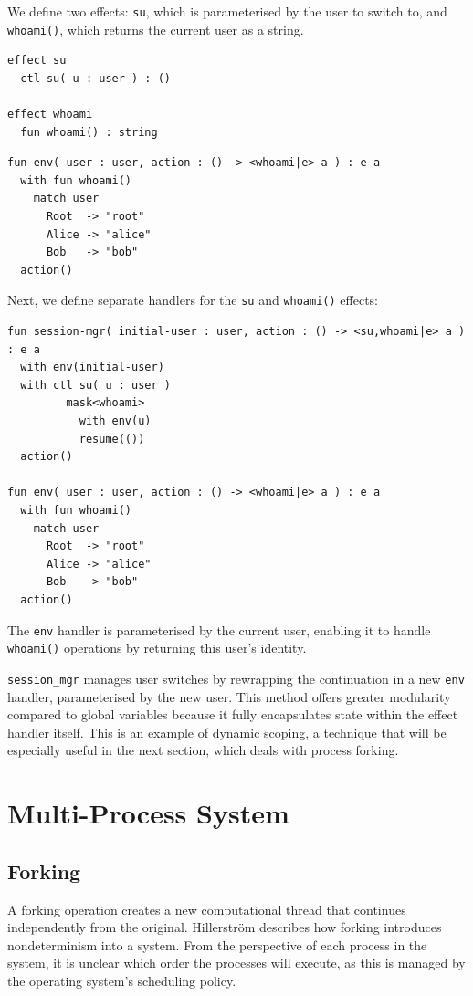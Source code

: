\documentclass[logo,bsc,singlespacing,parskip]{infthesis}
\begin{document}
We define two effects: \lstinline{su}, which is parameterised by the user to switch to, and \lstinline{whoami()}, which returns the current user as a string.

\begin{lstlisting}
effect su
  ctl su( u : user ) : ()

effect whoami
  fun whoami() : string
\end{lstlisting}


\begin{lstlisting}
fun env( user : user, action : () -> <whoami|e> a ) : e a
  with fun whoami() 
    match user
      Root  -> "root"
      Alice -> "alice"
      Bob   -> "bob"
  action()
\end{lstlisting}

Next, we define separate handlers for the \lstinline{su} and \lstinline{whoami()} effects:
\begin{lstlisting}
fun session-mgr( initial-user : user, action : () -> <su,whoami|e> a ) : e a
  with env(initial-user)
  with ctl su( u : user )
         mask<whoami>
           with env(u)
           resume(())
  action()

fun env( user : user, action : () -> <whoami|e> a ) : e a
  with fun whoami() 
    match user
      Root  -> "root"
      Alice -> "alice"
      Bob   -> "bob"
  action()
\end{lstlisting}

The \lstinline{env} handler is parameterised by the current user, enabling it to handle \lstinline{whoami()} operations by returning this user's identity.

\lstinline{session_mgr} manages user switches by rewrapping the continuation in a new \lstinline{env} handler, parameterised by the new user. This method offers greater modularity compared to global variables because it fully encapsulates state within the effect handler itself. This is an example of dynamic scoping, a technique that will be especially useful in the next section, which deals with process forking.

\section{Multi-Process System}
\subsection{Forking}
A forking operation creates a new computational thread that continues independently from the original. Hillerström describes how forking introduces nondeterminism into a system.  From the perspective of each process in the system, it is unclear which order the processes will execute, as this is managed by the operating system's scheduling policy. 
\end{document}
